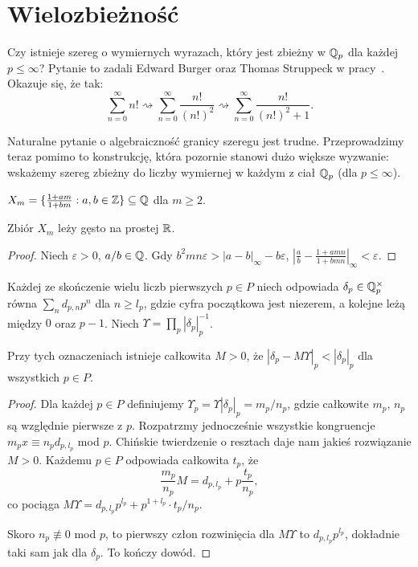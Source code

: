 \section{Wielozbieżność \label{burger}}
Czy istnieje szereg o wymiernych wyrazach, który jest zbieżny w $\mathbb Q_p$ dla każdej $p \le \infty$?
Pytanie to zadali Edward Burger oraz Thomas Struppeck w pracy~\cite{burger96}.
Okazuje się, że tak:
\[
	\sum_{n=0}^\infty n! \rightsquigarrow \sum_{n=0}^\infty \frac{n!}{(n!)^2} \rightsquigarrow \sum_{n=0}^\infty \frac{n!}{(n!)^2+1}.
\]

Naturalne pytanie o algebraiczność granicy szeregu jest trudne.
Przeprowadzimy teraz pomimo to konstrukcję, która pozornie stanowi dużo większe wyzwanie: wskażemy szereg zbieżny do liczby wymiernej w każdym z ciał $\mathbb Q_p$ (dla $p \le \infty$).

\begin{definicja}
	$X_m = \{\frac{1+am}{1 + bm} : a, b \in \mathbb Z\} \subseteq \mathbb Q$ dla $m \ge 2$.
\end{definicja}

\begin{lemat}[III]
	Zbiór $X_m$ leży gęsto na prostej $\mathbb R$.
\end{lemat}

\begin{proof}
	Niech $\varepsilon > 0$, $a/b \in \mathbb Q$.
	Gdy $b^2mn \varepsilon > |a-b|_\infty - b\varepsilon$,
	$|\frac ab- \frac{1+amn}{1 + bmn}|_\infty < \varepsilon$.
\end{proof}

Każdej ze skończenie wielu liczb pierwszych $p \in P$ niech odpowiada $\delta_p \in \mathbb Q_p^\times$ równa $\sum_n d_{p, n} p^n$ dla $n \ge l_p$, gdzie cyfra początkowa jest niezerem, a kolejne leżą między $0$ oraz $p-1$.
Niech $\Upsilon = \prod_p |\delta_p|_p^{-1}$.

\begin{lemat}[IV]
	Przy tych oznaczeniach istnieje całkowita $M > 0$, że $|\delta_p - M \Upsilon|_p < |\delta_p|_p$ dla wszystkich $p \in P$.
\end{lemat}

\begin{proof}
	Dla każdej $p \in P$ definiujemy $\Upsilon_p = \Upsilon |\delta_p|_p = m_p / n_p$, gdzie całkowite $m_p$, $n_p$ są względnie pierwsze z $p$.
	Rozpatrzmy jednocześnie wszystkie kongruencje $m_p x \equiv n_p d_{p, l_p}$ mod $p$.
	Chińskie twierdzenie o resztach daje nam jakieś rozwiązanie $M > 0$.
	Każdemu $p \in P$ odpowiada całkowita $t_p$, że
	\[
		\frac{m_p}{n_p} M = d_{p, l_p} + p \frac{t_p}{n_p},
	\]
	co pociąga $M \Upsilon = d_{p, l_p} p^{l_p} + p^{1+l_p} \cdot {t_p} / {n_p}$. 

	Skoro $n_p \not\equiv 0$ mod $p$, to pierwszy człon rozwinięcia dla $M \Upsilon$ to $d_{p, l_p}p^{l_p}$, dokładnie taki sam jak dla $\delta_p$. 
	To kończy dowód.
\end{proof}

